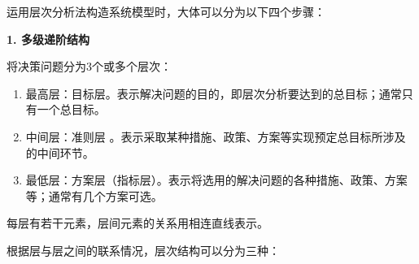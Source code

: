 \documentclass[a4paper,12pt]{article}
\begin{document}
运用层次分析法构造系统模型时，大体可以分为以下四个步骤：

\noindent
\textbf{1. 多级递阶结构}

将决策问题分为3个或多个层次：
\begin{enumerate}[itemsep=0pt,parsep=0pt]
    \item 最高层：目标层。表示解决问题的目的，即层次分析要达到的总目标；通常只有一个总目标。
    \item 中间层：准则层 。表示采取某种措施、政策、方案等实现预定总目标所涉及的中间环节。
    \item 最低层：方案层（指标层）。表示将选用的解决问题的各种措施、政策、方案等；通常有几个方案可选。
\end{enumerate} 
每层有若干元素，层间元素的关系用相连直线表示。

根据层与层之间的联系情况，层次结构可以分为三种：
\end{document}
